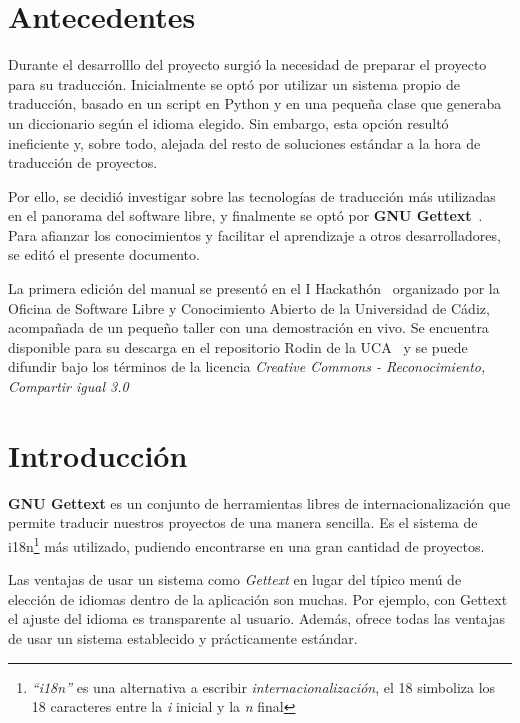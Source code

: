 
\setlength{\parindent}{0.3cm}
\section{Antecedentes}
Durante el desarrolllo del proyecto surgió la necesidad de preparar el proyecto
para su traducción. Inicialmente se optó por utilizar un sistema propio de
traducción, basado en un script en Python y en una pequeña clase que generaba un
diccionario según el idioma elegido. Sin embargo, esta opción resultó
ineficiente y, sobre todo, alejada del resto de soluciones estándar a la hora de
traducción de proyectos. 

Por ello, se decidió investigar sobre las tecnologías de traducción más
utilizadas en el panorama del software libre, y finalmente se optó por \textbf{GNU
Gettext}~\cite{refgettext}. Para afianzar los conocimientos y facilitar el aprendizaje a 
otros desarrolladores, se editó el presente documento.

La primera edición del manual se presentó en el I
Hackathón~\cite{refhackathonUCA} organizado por la Oficina de Software Libre y
Conocimiento Abierto de la Universidad de Cádiz, acompañada de un pequeño taller
con una demostración en vivo. Se encuentra disponible para su descarga en el
repositorio Rodin de la UCA~\cite{refmanualgettext} y se puede difundir
bajo los términos de la licencia \textit{Creative Commons - Reconocimiento,
  Compartir igual 3.0}~\cite{commonsbysa}

\section{Introducción}

\textbf{GNU Gettext} es un conjunto de herramientas libres de
internacionalización que permite traducir nuestros proyectos de una manera
sencilla. Es el sistema de i18n\footnote{\textit{``i18n''} es una alternativa a
  escribir \textit{internacionalización}, el 18 simboliza los 18 caracteres
  entre la \textit{i} inicial y la \textit{n} final} más utilizado, pudiendo
encontrarse en una gran cantidad de proyectos.

Las ventajas de usar un sistema como \textit{Gettext} en lugar del
típico menú de elección de idiomas dentro de la aplicación son
muchas. Por ejemplo, con Gettext el ajuste del idioma es transparente
al usuario. Además, ofrece todas las ventajas de usar un sistema
establecido y prácticamente estándar.

